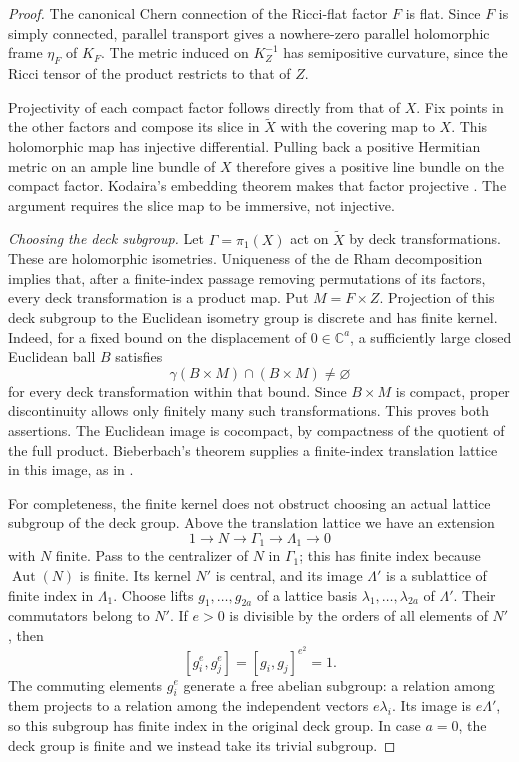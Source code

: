 \begin{proof}
The canonical Chern connection of the Ricci-flat factor $F$ is flat.
Since $F$ is simply connected, parallel transport gives a nowhere-zero
parallel holomorphic frame $\eta_F$ of $K_F$.  The metric induced on
$K_Z^{-1}$ has semipositive curvature, since the Ricci tensor of the
product restricts to that of $Z$.

Projectivity of each compact factor follows directly from that of
$X$.  Fix points in the other factors and compose its slice in
$\widetilde X$ with the covering map to $X$.  This holomorphic map
has injective differential.  Pulling back a positive Hermitian metric
on an ample line bundle of $X$ therefore gives a positive line bundle
on the compact factor.  Kodaira's embedding theorem makes that factor
projective \cite{Kodaira1954}.  The argument requires the slice map
to be immersive, not injective.

\smallskip\noindent
\emph{Choosing the deck subgroup.}
Let $\Gamma=\pi_1(X)$ act on $\widetilde X$ by deck transformations.
These are holomorphic isometries.  Uniqueness of the de Rham
decomposition implies that, after a finite-index passage removing
permutations of its factors, every deck transformation is a product
map.  Put $M=F\times Z$.  Projection of this deck subgroup to the
Euclidean isometry group is discrete and has finite kernel.  Indeed,
for a fixed bound on the displacement of $0\in\mathbb C^a$, a
sufficiently large closed Euclidean ball $B$ satisfies
\[
       \gamma(B\times M)\cap(B\times M)\ne\varnothing
\]
for every deck transformation within that bound.  Since $B\times M$
is compact, proper discontinuity allows only finitely many such
transformations.  This proves both assertions.  The Euclidean image
is cocompact, by compactness of the quotient of the full product.
Bieberbach's theorem supplies a finite-index translation lattice in
this image, as in \cite[\S3(ii)]{DPS1996}.

For completeness, the finite kernel does not obstruct choosing an
actual lattice subgroup of the deck group.  Above the translation
lattice we have an extension
\[
       1\longrightarrow N\longrightarrow\Gamma_1
        \longrightarrow\Lambda_1\longrightarrow 0
\]
with $N$ finite.  Pass to the centralizer of $N$ in $\Gamma_1$;
this has finite index because $\operatorname{Aut}(N)$ is finite.
Its kernel $N'$ is central, and its image $\Lambda'$ is a sublattice
of finite index in $\Lambda_1$.  Choose lifts
$g_1,\ldots,g_{2a}$ of a lattice basis $\lambda_1,\ldots,\lambda_{2a}$ of $\Lambda'$.
Their commutators belong to $N'$.  If $e>0$ is divisible by the orders
of all elements of $N'$, then
\[
                  [g_i^e,g_j^e]=[g_i,g_j]^{e^2}=1.
\]
The commuting elements $g_i^e$ generate a free abelian subgroup:
a relation among them projects to a relation among the independent
vectors $e\lambda_i$.  Its image is $e\Lambda'$, so this subgroup
has finite index in the original deck group.  In case $a=0$, the deck
group is finite and we instead take its trivial subgroup.


\end{proof}

